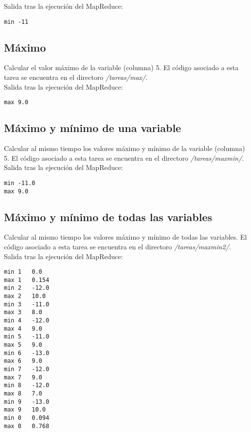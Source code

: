Salida tras la ejecución del MapReduce:

\begin{lstlisting}
min -11
\end{lstlisting}

\subsection{Máximo}

Calcular el valor máximo de la variable (columna) 5. El código asociado a esta tarea se encuentra en el directoro \textit{/tareas/max/}. \\

Salida tras la ejecución del MapReduce:

\begin{lstlisting}
max 9.0
\end{lstlisting}


\subsection{Máximo y mínimo de una variable}

Calcular al mismo tiempo los valores máximo y mínimo de la variable (columna) 5. El código asociado a esta tarea se encuentra en el directoro \textit{/tareas/maxmin/}. \\

Salida tras la ejecución del MapReduce:

\begin{lstlisting}
min	-11.0
max	9.0
\end{lstlisting}


\subsection{Máximo y mínimo de todas las variables}

Calcular al mismo tiempo los valores máximo y mínimo de todas las variables. El código asociado a esta tarea se encuentra en el directoro \textit{/tareas/maxmin2/}. \\

Salida tras la ejecución del MapReduce:

\begin{lstlisting}
min 1	0.0
max 1	0.154
min 2	-12.0
max 2	10.0
min 3	-11.0
max 3	8.0
min 4	-12.0
max 4	9.0
min 5	-11.0
max 5	9.0
min 6	-13.0
max 6	9.0
min 7	-12.0
max 7	9.0
min 8	-12.0
max 8	7.0
min 9	-13.0
max 9	10.0
min 0	0.094
max 0	0.768
\end{lstlisting}


